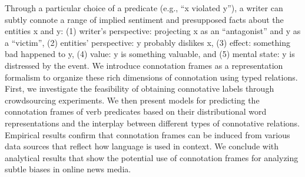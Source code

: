 Through a particular choice of a predicate (e.g., ``x violated y''), a writer can subtly connote a range of implied sentiment and presupposed facts about the entities x and y: (1) writer's perspective: projecting x as an ``antagonist'' and y as a ``victim'', (2) entities' perspective: y probably dislikes x, (3) effect: something bad happened to y, (4) value: y is something valuable, and (5) mental state: y is distressed by the event. We introduce connotation frames as a representation formalism to organize these rich dimensions of connotation using typed relations. First, we investigate the feasibility of obtaining connotative labels through crowdsourcing experiments. We then present models for predicting the connotation frames of verb predicates based on their distributional word representations and the interplay between different types of connotative relations. Empirical results confirm that connotation frames can be induced from various data sources that reflect how language is used in context. We conclude with analytical results that show the potential use of connotation frames for analyzing subtle biases in online news media.
